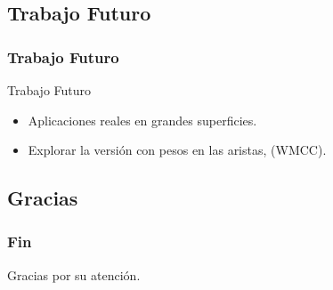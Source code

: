 \subsection{Trabajo Futuro}
\begin{frame} \frametitle{Trabajo Futuro}
\begin{block} {Trabajo Futuro}
 	 \begin{itemize}
 	 	\item Aplicaciones reales en grandes superficies.
 	 	\item Explorar la versión con pesos en las aristas, (WMCC).
 	 \end{itemize}  
 \end{block} 	   
\end{frame}

\subsection{Gracias}
\begin{frame} \frametitle{Fin}
\begin{huge}
Gracias por su atención.
\end{huge}
\end{frame}